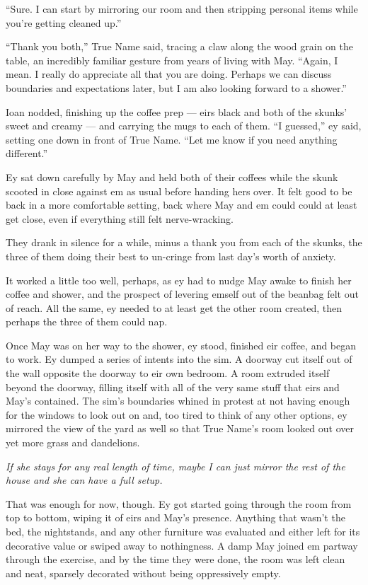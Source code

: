 ``Sure. I can start by mirroring our room and then stripping personal items while you're getting cleaned up.''

``Thank you both,'' True Name said, tracing a claw along the wood grain on the table, an incredibly familiar gesture from years of living with May. ``Again, I mean. I really do appreciate all that you are doing. Perhaps we can discuss boundaries and expectations later, but I am also looking forward to a shower.''

Ioan nodded, finishing up the coffee prep — eirs black and both of the skunks' sweet and creamy — and carrying the mugs to each of them. ``I guessed,'' ey said, setting one down in front of True Name. ``Let me know if you need anything different.''

Ey sat down carefully by May and held both of their coffees while the skunk scooted in close against em as usual before handing hers over. It felt good to be back in a more comfortable setting, back where May and em could could at least get close, even if everything still felt nerve-wracking.

They drank in silence for a while, minus a thank you from each of the skunks, the three of them doing their best to un-cringe from last day's worth of anxiety.

It worked a little too well, perhaps, as ey had to nudge May awake to finish her coffee and shower, and the prospect of levering emself out of the beanbag felt out of reach. All the same, ey needed to at least get the other room created, then perhaps the three of them could nap.

Once May was on her way to the shower, ey stood, finished eir coffee, and began to work. Ey dumped a series of intents into the sim. A doorway cut itself out of the wall opposite the doorway to eir own bedroom. A room extruded itself beyond the doorway, filling itself with all of the very same stuff that eirs and May's contained. The sim's boundaries whined in protest at not having enough for the windows to look out on and, too tired to think of any other options, ey mirrored the view of the yard as well so that True Name's room looked out over yet more grass and dandelions.

\emph{If she stays for any real length of time, maybe I can just mirror the rest of the house and she can have a full setup.}

That was enough for now, though. Ey got started going through the room from top to bottom, wiping it of eirs and May's presence. Anything that wasn't the bed, the nightstands, and any other furniture was evaluated and either left for its decorative value or swiped away to nothingness. A damp May joined em partway through the exercise, and by the time they were done, the room was left clean and neat, sparsely decorated without being oppressively empty.

